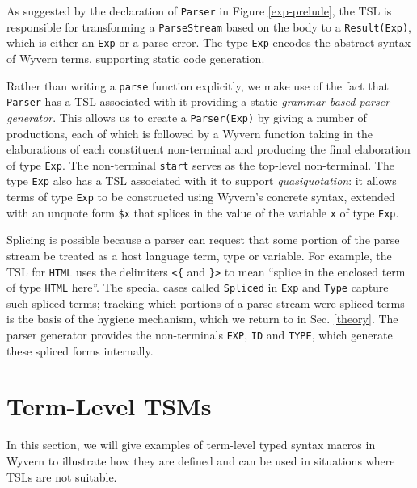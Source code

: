 \documentclass{sig-alternate}
\begin{document}
As suggested by the declaration of \verb|Parser| in Figure \ref{exp-prelude}, the TSL is responsible for transforming a \verb|ParseStream| based on the body to a \verb|Result(Exp)|, which is either an \verb|Exp| or a parse error. The type \verb|Exp| encodes the abstract syntax of Wyvern terms, supporting static code generation.

Rather than writing a \verb|parse| function explicitly, we make use of the fact that \verb|Parser| has a TSL associated with it providing a static \emph{grammar-based parser generator}. This allows us to create a \verb|Parser(Exp)| by giving a number of productions, each of which is followed by a Wyvern function taking in the elaborations of each constituent non-terminal and producing the final elaboration of type \verb|Exp|. The non-terminal \verb|start| serves as the top-level non-terminal. The type \verb|Exp| also has a TSL associated with it to support \emph{quasiquotation}: it allows terms of type \verb|Exp| to be constructed using Wyvern's concrete syntax, extended with an unquote form \verb|$x| that splices in the value of the variable \verb|x| of type \verb|Exp|.  %

Splicing is possible because a parser can request that some portion of the parse stream be treated as a host language term, type or variable. For example, the TSL for \verb|HTML| uses the delimiters \verb|<{| and \verb|}>| to mean ``splice in the enclosed term  of type \verb|HTML| here''. The special cases called \verb|Spliced| in \verb|Exp| and \verb|Type| capture such spliced terms; tracking which portions of a parse stream were spliced terms is the basis of the hygiene mechanism, which we return to in Sec. \ref{theory}. The parser generator provides the non-terminals \verb|EXP|, \verb|ID| and \verb|TYPE|, which generate these spliced forms internally. %



\section{Term-Level TSM\lowercase{s}}\label{tsms-term}
In this section, we will give examples of term-level typed syntax macros in Wyvern to illustrate how they are defined and can be used in situations where TSLs are not suitable. %
\end{document}
